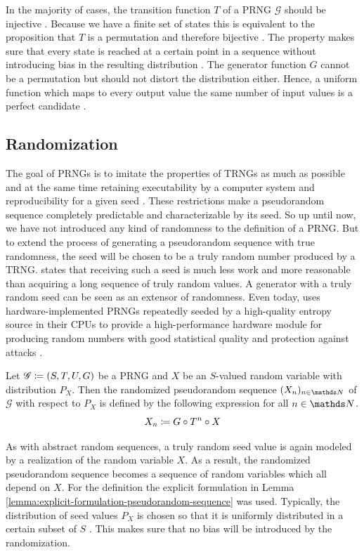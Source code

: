 \documentclass{stdlocal}
\begin{document}
  In the majority of cases, the transition function $T$ of a PRNG $\mathscr{G}$ should be injective \autocite{lecuyer1994,lecuyer2015,widynski2019,oneill2014}.
  Because we have a finite set of states this is equivalent to the proposition that $T$ is a permutation and therefore bijective \autocite[\ppno~201-202]{waldmann2017}.
  The property makes sure that every state is reached at a certain point in a sequence without introducing bias in the resulting distribution \autocite{oneill2014}.
  The generator function $G$ cannot be a permutation but should not distort the distribution either.
  Hence, a uniform function which maps to every output value the same number of input values is a perfect candidate \autocite{oneill2014}.

  \subsection{Randomization}
  The goal of PRNGs is to imitate the properties of TRNGs as much as possible \autocite{lecuyer1994} and at the same time retaining executability by a computer system and reproducibility for a given seed \autocite{lecuyer2015}.
  These restrictions make a pseudorandom sequence completely predictable and characterizable by its seed.
  So up until now, we have not introduced any kind of randomness to the definition of a PRNG.
  But to extend the process of generating a pseudorandom sequence with true randomness, the seed will be chosen to be a truly random number produced by a TRNG.
  \textcite{lecuyer1994} states that receiving such a seed is much less work and more reasonable than acquiring a long sequence of truly random values.
  A generator with a truly random seed can be seen as an extensor of randomness.
  Even today, \citeauthor{intel-drng} uses hardware-implemented PRNGs repeatedly seeded by a high-quality entropy source in their CPUs to provide a high-performance hardware module for producing random numbers with good statistical quality and protection against attacks \autocite{intel-drng}.

  \begin{definition}
    Let $\mathscr{G}\coloneqq (S,T,U,G)$ be a PRNG and $X$ be an $S$-valued random variable with distribution $P_X$.
    Then the randomized pseudorandom sequence $(X_n)_{n\in\setNatural}$ of $\mathscr{G}$ with respect to $P_X$ is defined by the following expression for all $n\in\setNatural$.
    \[
      X_n \coloneqq G \circ T^n \circ X
    \]
  \end{definition}
  As with abstract random sequences, a truly random seed value is again modeled by a realization of the random variable $X$.
  As a result, the randomized pseudorandom sequence becomes a sequence of random variables which all depend on $X$.
  For the definition the explicit formulation in Lemma \ref{lemma:explicit-formulation-pseudorandom-sequence} was used.
  Typically, the distribution of seed values $P_X$ is chosen so that it is uniformly distributed in a certain subset of $S$ \autocite{matsumoto1998,oneill2014,lecuyer1994,lecuyer2015,bauke2007}.
  This makes sure that no bias will be introduced by the randomization.
\end{document}
